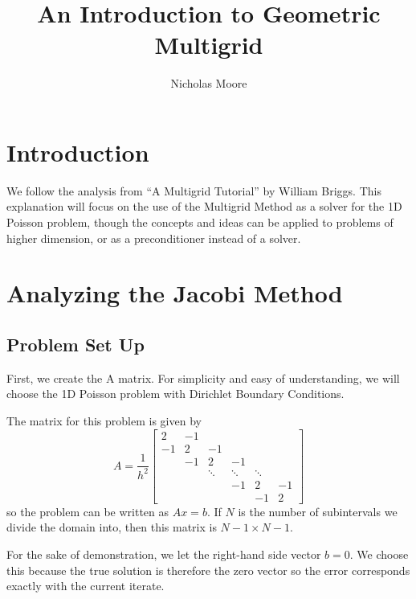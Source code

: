 \documentclass[11pt]{article}
\title{An Introduction to Geometric Multigrid}
\author{Nicholas Moore}
\begin{document}
    
    \maketitle
    

    \hypertarget{introduction}{%
\section{Introduction}\label{introduction}}

We follow the analysis from ``A Multigrid Tutorial'' by William Briggs.
This explanation will focus on the use of the Multigrid Method as a
solver for the 1D Poisson problem, though the concepts and ideas can be
applied to problems of higher dimension, or as a preconditioner instead
of a solver.

    \hypertarget{analyzing-the-jacobi-method}{%
\section{Analyzing the Jacobi
Method}\label{analyzing-the-jacobi-method}}

    \hypertarget{problem-set-up}{%
\subsection{Problem Set Up}\label{problem-set-up}}

First, we create the A matrix. For simplicity and easy of understanding,
we will choose the 1D Poisson problem with Dirichlet Boundary Conditions.

The matrix for this problem is given by \[
A = \frac{1}{h^2}
\begin{bmatrix}
2  & -1 &        &        &        &   \\
-1 &  2 & -1     &        &        &   \\
   & -1 &  2     &     -1 &        &   \\
   &    & \ddots & \ddots & \ddots &   \\
   &    &        &     -1 &      2 & -1 \\
   &    &        &        &     -1 &  2
\end{bmatrix}
\] so the problem can be written as \(Ax = b\). If \(N\) is the number
of subintervals we divide the domain into, then this matrix is
\(N-1 \times N-1\).

For the sake of demonstration, we let the right-hand side vector \(b = 0\). We
choose this because the true solution is therefore the zero vector so the error
corresponds exactly with the current iterate.
\end{document}
